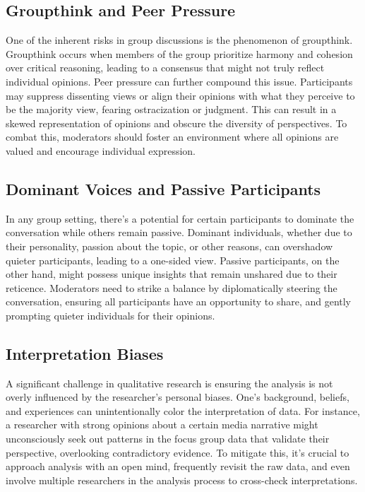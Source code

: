 \documentclass[
  b5paper]{book}
\begin{document}
\hypertarget{groupthink-and-peer-pressure}{%
\subsection*{Groupthink and Peer Pressure}\label{groupthink-and-peer-pressure}}

One of the inherent risks in group discussions is the phenomenon of groupthink. Groupthink occurs when members of the group prioritize harmony and cohesion over critical reasoning, leading to a consensus that might not truly reflect individual opinions. Peer pressure can further compound this issue. Participants may suppress dissenting views or align their opinions with what they perceive to be the majority view, fearing ostracization or judgment. This can result in a skewed representation of opinions and obscure the diversity of perspectives. To combat this, moderators should foster an environment where all opinions are valued and encourage individual expression.

\hypertarget{dominant-voices-and-passive-participants}{%
\subsection*{Dominant Voices and Passive Participants}\label{dominant-voices-and-passive-participants}}

In any group setting, there's a potential for certain participants to dominate the conversation while others remain passive. Dominant individuals, whether due to their personality, passion about the topic, or other reasons, can overshadow quieter participants, leading to a one-sided view. Passive participants, on the other hand, might possess unique insights that remain unshared due to their reticence. Moderators need to strike a balance by diplomatically steering the conversation, ensuring all participants have an opportunity to share, and gently prompting quieter individuals for their opinions.

\hypertarget{interpretation-biases}{%
\subsection*{Interpretation Biases}\label{interpretation-biases}}

A significant challenge in qualitative research is ensuring the analysis is not overly influenced by the researcher's personal biases. One's background, beliefs, and experiences can unintentionally color the interpretation of data. For instance, a researcher with strong opinions about a certain media narrative might unconsciously seek out patterns in the focus group data that validate their perspective, overlooking contradictory evidence. To mitigate this, it's crucial to approach analysis with an open mind, frequently revisit the raw data, and even involve multiple researchers in the analysis process to cross-check interpretations.
\end{document}

